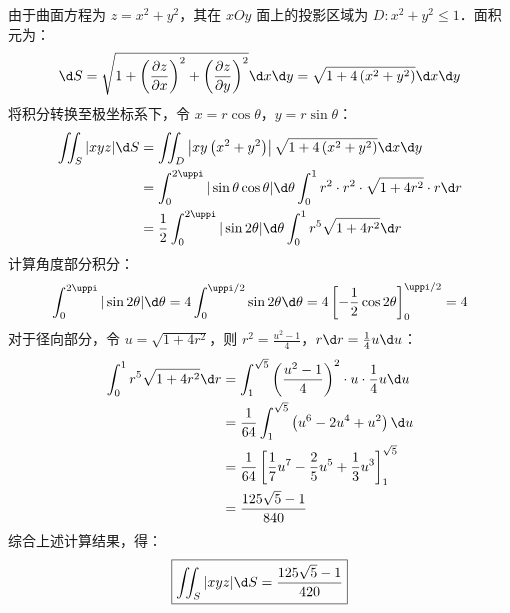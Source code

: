 \begin{solution}
    由于曲面方程为 $z=x^{2}+y^{2}$，其在 $xOy$ 面上的投影区域为 $D: x^{2}+y^{2} \le 1$．面积元为：
    \begin{equation}
        \d S = \sqrt{1+\left(\frac{\partial z}{\partial x}\right)^{2}+\left(\frac{\partial z}{\partial y}\right)^{2}} \d x \d y = \sqrt{1+4\left(x^{2}+y^{2}\right)} \d x \d y
    \end{equation}
    将积分转换至极坐标系下，令 $x=r \cos \theta$，$y=r \sin \theta$：
    \begin{equation}
        \begin{aligned}
            \iint_{S}|x y z| \d S & = \iint_{D}\left|x y\left(x^{2}+y^{2}\right)\right| \sqrt{1+4\left(x^{2}+y^{2}\right)} \d x \d y                           \\
                                  & = \int_{0}^{2 \uppi}|\sin \theta \cos \theta| \d \theta \int_{0}^{1} r^{2} \cdot r^{2} \cdot \sqrt{1+4 r^{2}} \cdot r \d r \\
                                  & = \frac{1}{2} \int_{0}^{2 \uppi}|\sin 2 \theta| \d \theta \int_{0}^{1} r^{5} \sqrt{1+4 r^{2}} \d r
        \end{aligned}
    \end{equation}
    计算角度部分积分：
    \begin{equation}
        \int_{0}^{2 \uppi}|\sin 2 \theta| \d \theta = 4 \int_{0}^{\uppi / 2} \sin 2 \theta \d \theta = 4 \left[ -\frac{1}{2} \cos 2 \theta \right]_{0}^{\uppi / 2} = 4
    \end{equation}
    对于径向部分，令 $u=\sqrt{1+4 r^{2}}$，则 $r^{2}=\frac{u^{2}-1}{4}$，$r \d r = \frac{1}{4} u \d u$：
    \begin{equation}
        \begin{aligned}
            \int_{0}^{1} r^{5} \sqrt{1+4 r^{2}} \d r & = \int_{1}^{\sqrt{5}}\left(\frac{u^{2}-1}{4}\right)^{2} \cdot u \cdot \frac{1}{4} u \d u        \\
                                                     & = \frac{1}{64} \int_{1}^{\sqrt{5}}\left(u^{6}-2 u^{4}+u^{2}\right) \d u                         \\
                                                     & = \frac{1}{64}\left[\frac{1}{7} u^{7}-\frac{2}{5} u^{5}+\frac{1}{3} u^{3}\right]_{1}^{\sqrt{5}} \\
                                                     & = \frac{125 \sqrt{5}-1}{840}
        \end{aligned}
    \end{equation}
    综合上述计算结果，得：
    \begin{equation}
        \boxed{\iint_{S}|x y z| \d S = \frac{125 \sqrt{5}-1}{420}}
    \end{equation}
\end{solution}

